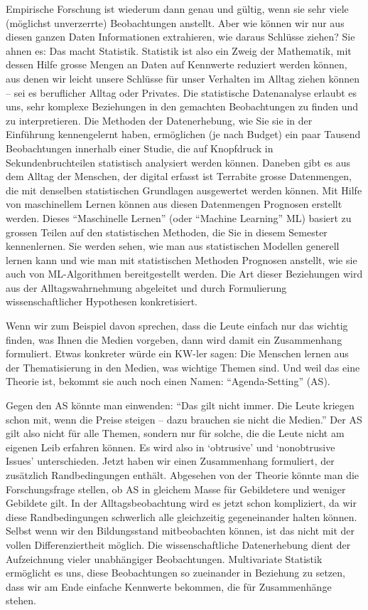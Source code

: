 \documentclass[
  10pt,
  letterpaper,
  a4paper, twoside]{scrreprt}
\begin{document}
Empirische Forschung ist wiederum dann genau und gültig, wenn sie sehr
viele (möglichst unverzerrte) Beobachtungen anstellt. Aber wie können
wir nur aus diesen ganzen Daten Informationen extrahieren, wie daraus
Schlüsse ziehen? Sie ahnen es: Das macht Statistik. Statistik ist also
ein Zweig der Mathematik, mit dessen Hilfe grosse Mengen an Daten auf
Kennwerte reduziert werden können, aus denen wir leicht unsere Schlüsse
für unser Verhalten im Alltag ziehen können -- sei es beruflicher Alltag
oder Privates. Die statistische Datenanalyse erlaubt es uns, sehr
komplexe Beziehungen in den gemachten Beobachtungen zu finden und zu
interpretieren. Die Methoden der Datenerhebung, wie Sie sie in der
Einführung kennengelernt haben, ermöglichen (je nach Budget) ein paar
Tausend Beobachtungen innerhalb einer Studie, die auf Knopfdruck in
Sekundenbruchteilen statistisch analysiert werden können. Daneben gibt
es aus dem Alltag der Menschen, der digital erfasst ist Terrabite grosse
Datenmengen, die mit denselben statistischen Grundlagen ausgewertet
werden können. Mit Hilfe von maschinellem Lernen können aus diesen
Datenmengen Prognosen erstellt werden. Dieses \enquote{Maschinelle
Lernen} (oder \enquote{Machine Learning} ML) basiert zu grossen Teilen
auf den statistischen Methoden, die Sie in diesem Semester kennenlernen.
Sie werden sehen, wie man aus statistischen Modellen generell lernen
kann und wie man mit statistischen Methoden Prognosen anstellt, wie sie
auch von ML-Algorithmen bereitgestellt werden. Die Art dieser
Beziehungen wird aus der Alltagswahrnehmung abgeleitet und durch
Formulierung wissenschaftlicher Hypothesen konkretisiert.

Wenn wir zum Beispiel davon sprechen, dass die Leute einfach nur das
wichtig finden, was Ihnen die Medien vorgeben, dann wird damit ein
Zusammenhang formuliert. Etwas konkreter würde ein KW-ler sagen: Die
Menschen lernen aus der Thematisierung in den Medien, was wichtige
Themen sind. Und weil das eine Theorie ist, bekommt sie auch noch einen
Namen: \enquote{Agenda-Setting} (AS).

Gegen den AS könnte man einwenden: \enquote{Das gilt nicht immer. Die
Leute kriegen schon mit, wenn die Preise steigen -- dazu brauchen sie
nicht die Medien.} Der AS gilt also nicht für alle Themen, sondern nur
für solche, die die Leute nicht am eigenen Leib erfahren können. Es wird
also in \enquote*{obtrusive} und \enquote*{nonobtrusive Issues}
unterschieden. Jetzt haben wir einen Zusammenhang formuliert, der
zusätzlich Randbedingungen enthält. Abgesehen von der Theorie könnte man
die Forschungsfrage stellen, ob AS in gleichem Masse für Gebildetere und
weniger Gebildete gilt. In der Alltagsbeobachtung wird es jetzt schon
kompliziert, da wir diese Randbedingungen schwerlich alle gleichzeitig
gegeneinander halten können. Selbst wenn wir den Bildungsstand
mitbeobachten können, ist das nicht mit der vollen Differenziertheit
möglich. Die wissenschaftliche Datenerhebung dient der Aufzeichnung
vieler unabhängiger Beobachtungen. Multivariate Statistik ermöglicht es
uns, diese Beobachtungen so zueinander in Beziehung zu setzen, dass wir
am Ende einfache Kennwerte bekommen, die für Zusammenhänge stehen.
\end{document}

